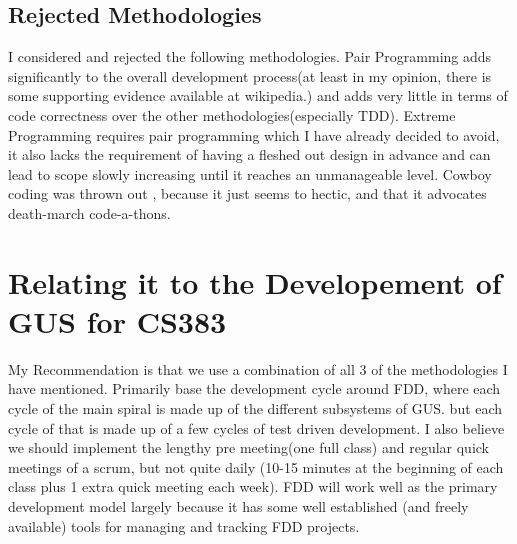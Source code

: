 \documentclass[10pt]{article}
\begin{document}
\subsection*{Rejected Methodologies}
I considered and rejected the following methodologies. Pair Programming adds significantly to the overall development process(at least in my opinion, there is some supporting evidence available at wikipedia.) and adds very little in terms of code correctness over the other methodologies(especially TDD).  Extreme Programming requires pair programming which I have already decided to avoid, it also lacks the requirement of having a fleshed out design in advance and can lead to scope slowly increasing until it reaches an unmanageable level. Cowboy coding was thrown out , because it just seems to hectic, and that it advocates death-march code-a-thons.
\section*{Relating it to the Developement of GUS for CS383}
My Recommendation is that we use a combination of all 3 of the methodologies I have mentioned. Primarily base
the development cycle around FDD, where each cycle of the main spiral is made up of the different subsystems of GUS. but each cycle of that is made up of a few cycles of test driven development.  I also believe we should implement the lengthy pre meeting(one full class) and regular quick meetings of a scrum, but not quite daily (10-15 minutes at the beginning of each class plus 1 extra quick meeting each week). FDD will work well as the primary development model largely because it has some well established (and freely available) tools for managing and tracking FDD projects.
\end{document}
